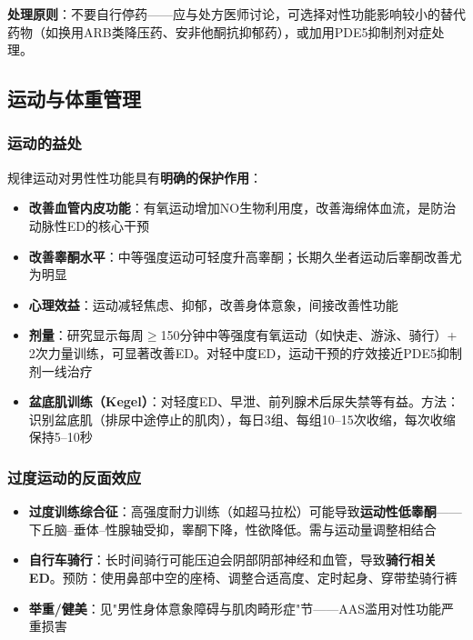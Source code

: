\textbf{处理原则}：不要自行停药——应与处方医师讨论，可选择对性功能影响较小的替代药物（如换用ARB类降压药、安非他酮抗抑郁药），或加用PDE5抑制剂对症处理。

\subsection{运动与体重管理}

\subsubsection{运动的益处}

规律运动对男性性功能具有\textbf{明确的保护作用}：

\begin{itemize}[leftmargin=2cm]
	\item \textbf{改善血管内皮功能}：有氧运动增加NO生物利用度，改善海绵体血流，是防治动脉性ED的核心干预
	\item \textbf{改善睾酮水平}：中等强度运动可轻度升高睾酮；长期久坐者运动后睾酮改善尤为明显
	\item \textbf{心理效益}：运动减轻焦虑、抑郁，改善身体意象，间接改善性功能
	\item \textbf{剂量}：研究显示每周$\ge$150分钟中等强度有氧运动（如快走、游泳、骑行）+ 2次力量训练，可显著改善ED。对轻中度ED，运动干预的疗效接近PDE5抑制剂一线治疗
	\item \textbf{盆底肌训练（Kegel）}：对轻度ED、早泄、前列腺术后尿失禁等有益。方法：识别盆底肌（排尿中途停止的肌肉），每日3组、每组10--15次收缩，每次收缩保持5--10秒
\end{itemize}

\subsubsection{过度运动的反面效应}

\begin{itemize}[leftmargin=2cm]
	\item \textbf{过度训练综合征}：高强度耐力训练（如超马拉松）可能导致\textbf{运动性低睾酮}——下丘脑--垂体--性腺轴受抑，睾酮下降，性欲降低。需与运动量调整相结合
	\item \textbf{自行车骑行}：长时间骑行可能压迫会阴部阴部神经和血管，导致\textbf{骑行相关ED}。预防：使用鼻部中空的座椅、调整合适高度、定时起身、穿带垫骑行裤
	\item \textbf{举重/健美}：见"男性身体意象障碍与肌肉畸形症"节——AAS滥用对性功能严重损害
\end{itemize}

